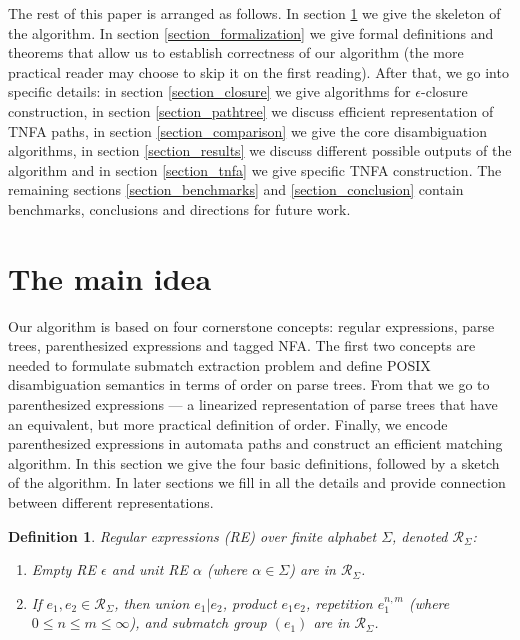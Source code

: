 \documentclass[AMA,STIX1COL]{WileyNJD-v2}
\newcommand{\XR}{\mathcal{R}}
\newtheorem{Xdef}{Definition}
\begin{document}
The rest of this paper is arranged as follows.
In section \ref{section_main} we give the skeleton of the algorithm.
In section \ref{section_formalization} we give formal definitions and theorems
that allow us to establish correctness of our algorithm
(the more practical reader may choose to skip it on the first reading).
After that, we go into specific details:
in section \ref{section_closure} we give algorithms for $\epsilon$-closure construction,
in section \ref{section_pathtree} we discuss efficient representation of TNFA paths,
in section \ref{section_comparison} we give the core disambiguation algorithms,
in section \ref{section_results} we discuss different possible outputs of the algorithm
and in section \ref{section_tnfa} we give specific TNFA construction.
The remaining sections \ref{section_benchmarks} and \ref{section_conclusion}
contain benchmarks, conclusions and directions for future work.

\section{The main idea}\label{section_main}

Our algorithm is based on four cornerstone concepts:
regular expressions, parse trees, parenthesized expressions and tagged NFA.
The first two concepts are needed to formulate submatch extraction problem
and define POSIX disambiguation semantics in terms of order on parse trees.
From that we go to parenthesized expressions --- a linearized representation of parse trees
that have an equivalent, but more practical definition of order.
Finally, we encode parenthesized expressions in automata paths
and construct an efficient matching algorithm.
In this section we give the four basic definitions, followed by a sketch of the algorithm.
In later sections we fill in all the details and provide connection between different representations.

    \begin{Xdef}
    \emph{Regular expressions (RE)} over finite alphabet $\Sigma$, denoted $\XR_\Sigma$:
    \begin{enumerate}
        \item
          Empty RE $\epsilon$ and
          unit RE $\alpha$ (where $\alpha \in \Sigma$) are in $\XR_\Sigma$.
        \item If $e_1, e_2 \in \XR_\Sigma$, then
          union $e_1 | e_2$,
          product $e_1 e_2$,
          repetition $e_1^{n, m}$ (where $0 \leq n \leq m \leq \infty$), and
          submatch group $(e_1)$
          are in $\XR_\Sigma$.
    \end{enumerate}
    \end{Xdef}
\end{document}
